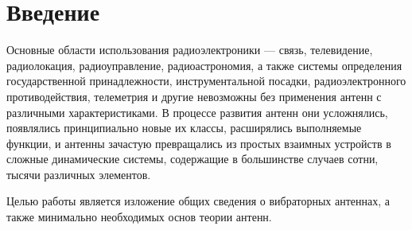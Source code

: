 \section*{Введение}
%


Основные области использования радиоэлектроники — связь, телевидение, радиолокация, радиоуправление, радиоастрономия, а также системы определения государственной принадлежности, инструментальной посадки, радиоэлектронного противодействия, телеметрия и другие невозможны без применения антенн с различными характеристиками. В процессе развития антенн они усложнялись, появлялись принципиально новые их классы, расширялись выполняемые функции, и антенны зачастую превращались из простых взаимных устройств в сложные динамические системы, содержащие в большинстве случаев сотни, тысячи различных элементов.

Целью работы является изложение общих сведения о вибраторных антеннах, а также минимально необходимых основ теории антенн.

